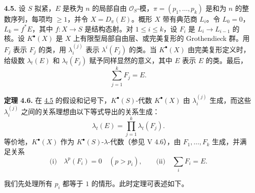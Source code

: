 \noindent\textbf{4.5.}
设 \(S\) 拟紧，\(E\) 是秩为 \(n\) 的局部自由 \(\mathcal O_S\)-模，\(\pi=(p_1,\ldots,p_k)\) 是和为 \(n\) 的整数序列，每项均 \(\geq 1\)，并令 \(X=D_\pi(E)\)。概形 \(X\) 带有典范商 \(L_i\)。令 \(L_0=0\)，\(L_k=f^*E\)，其中 \(f:X\to S\) 是结构态射。对 \(1\leq i\leq k\)，设 \(F_i\) 是 \(L_i\to L_{i-1}\) 的核。设 \(K^\bullet(X)\) 是 \(X\) 上有限型局部自由层、或完美复形的 Grothendieck 群。用 \(F_j\) 表示 \(F_j\) 的类，用 \(\lambda_i^{(j)}\) 表示 \(\lambda^i(F_j)\) 的类。当 \(K^\bullet(X)\) 由完美复形定义时，给级数 \(\lambda_t(E)\) 和 \(\lambda_t(F_j)\) 赋予同样显然的意义，其中 \(E\) 表示 \(E\) 的类。最后，
\[
  \sum_{j=1}^{k}F_j=E.
\]

\textbf{定理 4.6.} 在 \hyperlink{sga6.e06.sec.4.5}{4.5} 的假设和记号下，\(K^\bullet(S)\)-代数 \(K^\bullet(X)\) 由 \(\lambda_i^{(j)}\) 生成，而这些 \(\lambda_i^{(j)}\) 之间的关系理想由以下等式导出的关系生成：
\[
  \lambda_t(E)=\prod_{j=1}^{k}\lambda_t(F_j).
\]
等价地，\(K^\bullet(X)\) 作为 \(K^\bullet(S)\)-\(\lambda\)-代数（参见 V 4.6），由 \(F_1,\ldots,F_k\) 生成，并满足关系
\[
  \text{(i)}\quad \lambda^p(F_i)=0\quad(p>p_i),
  \qquad
  \text{(ii)}\quad \sum_i F_i=E.
\]

我们先处理所有 \(p_i\) 都等于 \(1\) 的情形。此时定理可表述如下。

